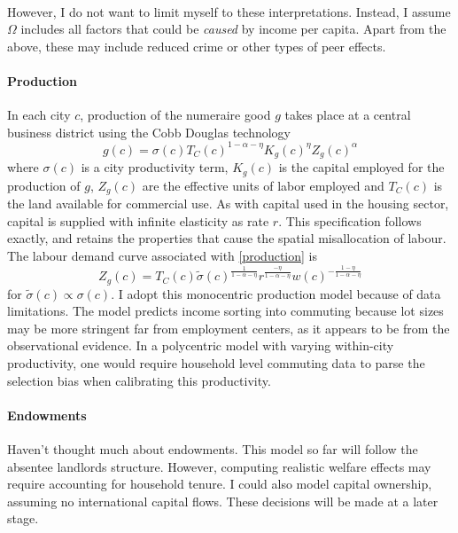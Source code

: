 \documentclass[]{article}
\begin{document}
 \paragraph*{}
However, I do not want to limit myself to these interpretations. Instead, I assume $\Omega$ includes all factors that could be \textit{caused} by income per capita. Apart from the above, these may include reduced crime or other types of peer effects. 
 
 
\paragraph*{Production} In each city $c$, production of the numeraire good $g$ takes place at a central business district using the Cobb Douglas technology
\begin{equation}\label{production}
g(c) = \sigma(c)T_{C}(c)^{1- \alpha - \eta}K_{g}(c)^{\eta}Z_{g}(c)^{\alpha}  
\end{equation}
 where $\sigma(c)$ is a city productivity term, $K_{g}(c)$ is the capital employed for the production of $g$, $Z_{g}(c)$ are the effective units of labor employed and $T_{C}(c)$ is the land available for commercial use. As with capital used in the housing sector, capital is supplied with infinite elasticity as rate $r$. This specification follows \cite{hseihmoretti} exactly, and retains the properties that cause the spatial misallocation of labour. The labour demand curve associated with \eqref{production} is
 \begin{equation}\label{labourdemand}
 	Z_{g}(c) = T_{C}(c)\tilde{\sigma}(c)^{\frac{1}{1-\alpha - \eta}}r^{\frac{-\eta}{1-\alpha - \eta}}w(c)^{-\frac{1 - \eta}{1 - \alpha - \eta}}
 \end{equation}
 for $\tilde{\sigma}(c) \propto \sigma(c)$. I adopt this monocentric production model because of data limitations. The model predicts income sorting into commuting because lot sizes may be more stringent far from employment centers, as it appears to be from the observational evidence. In a polycentric model with varying within-city productivity, one would require household level commuting data to parse the selection bias when calibrating this productivity.
 
 \paragraph*{Endowments}Haven't thought much about endowments. This model so far will follow the absentee landlords structure. However, computing realistic welfare effects may require accounting for household tenure. I could also model capital ownership, assuming no international capital flows. These decisions will be made at a later stage. 
 
\end{document}
